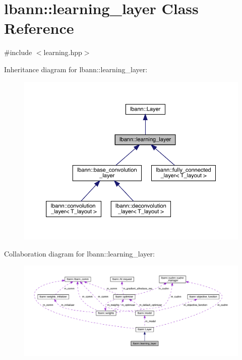 \hypertarget{classlbann_1_1learning__layer}{}\section{lbann\+:\+:learning\+\_\+layer Class Reference}
\label{classlbann_1_1learning__layer}


{\ttfamily \#include $<$learning.\+hpp$>$}



Inheritance diagram for lbann\+:\+:learning\+\_\+layer\+:\nopagebreak
\begin{figure}[H]
\begin{center}
\leavevmode
\includegraphics[width=350pt]{classlbann_1_1learning__layer__inherit__graph}
\end{center}
\end{figure}


Collaboration diagram for lbann\+:\+:learning\+\_\+layer\+:\nopagebreak
\begin{figure}[H]
\begin{center}
\leavevmode
\includegraphics[width=350pt]{classlbann_1_1learning__layer__coll__graph}
\end{center}
\end{figure}
